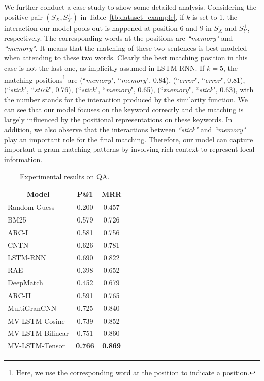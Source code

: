\documentclass[letterpaper]{article}
\begin{document}
We further conduct a case study to show some detailed analysis. Considering the positive pair $(S_X,S_Y^+)$ in Table~\ref{tb:dataset_example}, if $k$ is set to 1, the interaction our model pools out is happened at position $6$ and $9$ in $S_X$ and $S_Y^+$, respectively. The corresponding words at the positions are {\em ``memory"} and {\em ``memory"}. It means that the matching of these two sentences is best modeled when attending to these two words. Clearly the best matching position in this case is not the last one, as implicitly assumed in LSTM-RNN. If $k=5$, the matching positions\footnote{Here, we use the corresponding word at the position to indicate a position.} are (``{\em memory}", ``{\em memory}", 0.84), (``{\em error}", ``{\em error}", 0.81), (``{\em stick}", ``{\em stick}", 0.76), (``{\em stick}", ``{\em memory}", 0.65),  (``{\em memory}", ``{\em stick}", 0.63), with the number stands for the interaction produced by the similarity function. We can see that our model focuses on the keyword correctly and the matching is largely influenced by the positional representations on these keywords. In addition, we also observe that the interactions between {\em ``stick"} and {\em ``memory"} play an important role for the final matching. Therefore, our model can capture important n-gram matching patterns by involving rich context to represent local information.
\begin{table}[t]
\centering
\caption{Experimental results on QA.}
\label{tb:qa}
\begin{tabular}{lcc} \hline
\multicolumn{1}{c}{Model} &
\multicolumn{1}{c}{P@1} &
\multicolumn{1}{c}{MRR} \\ \hline
Random Guess			& 0.200  & 0.457    \\
BM25        			& 0.579 & 0.726 	    \\ \hline
ARC-I 					& 0.581 & 0.756 		\\
CNTN					& 0.626 & 0.781 		\\
LSTM-RNN   		  		& 0.690 	& 0.822 		\\ \hline
RAE	 					& 0.398 & 0.652		\\
DeepMatch  				& 0.452 & 0.679		\\
ARC-II 					& 0.591 & 0.765 		\\
MultiGranCNN				& 0.725 	& 0.840 		\\ \hline
MV-LSTM-Cosine & 0.739 & 0.852 \\
MV-LSTM-Bilinear & 0.751 & 0.860 \\
MV-LSTM-Tensor  		& \textbf{0.766} 	& \textbf{0.869}		\\
\hline
\end{tabular}
\end{table}
\end{document}
